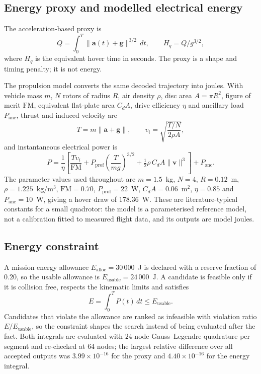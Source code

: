 \documentclass[conference]{IEEEtran}
\begin{document}
\subsection{Energy proxy and modelled electrical energy}
The acceleration-based proxy is
\begin{equation}
Q = \int_0^{T} \lVert \mathbf{a}(t) + \mathbf{g} \rVert^{3/2}\, dt ,
\qquad H_q = Q / g^{3/2},
\end{equation}
where $H_q$ is the equivalent hover time in seconds. The proxy is a shape and
timing penalty; it is not energy.

The propulsion model converts the same decoded trajectory into joules. With
vehicle mass $m$, $N$ rotors of radius $R$, air density $\rho$, disc area $A =
\pi R^2$, figure of merit $\mathrm{FM}$, equivalent flat-plate area $C_dA$,
drive efficiency $\eta$ and ancillary load $P_{\mathrm{anc}}$, thrust and
induced velocity are
\begin{equation}
T = m\lVert \mathbf{a} + \mathbf{g}\rVert, \qquad
v_i = \sqrt{\frac{T/N}{2\rho A}},
\end{equation}
and instantaneous electrical power is
\begin{equation}
P = \frac{1}{\eta}\!\left[\frac{T v_i}{\mathrm{FM}}
+ P_{\mathrm{prof}}\!\left(\frac{T}{mg}\right)^{3/2}
+ \tfrac{1}{2}\rho\, C_dA \lVert \mathbf{v}\rVert^3\right] + P_{\mathrm{anc}}.
\end{equation}
The parameter values used throughout are $m = 1.5$~kg, $N = 4$, $R = 0.12$~m,
$\rho = 1.225$~kg/m$^3$, $\mathrm{FM} = 0.70$, $P_{\mathrm{prof}} = 22$~W,
$C_dA = 0.06$~m$^2$, $\eta = 0.85$ and $P_{\mathrm{anc}} = 10$~W, giving a hover
draw of $178.36$~W. These are literature-typical constants for a small
quadrotor: the model is a parameterised reference model, not a calibration
fitted to measured flight data, and its outputs are model joules.

\subsection{Energy constraint}
A mission energy allowance $E_{\mathrm{alloc}} = 30\,000$~J is declared with a
reserve fraction of $0.20$, so the usable allowance is $E_{\mathrm{usable}} =
24\,000$~J. A candidate is feasible only if it is collision free, respects the
kinematic limits and satisfies
\begin{equation}
E = \int_0^T P(t)\,dt \le E_{\mathrm{usable}} .
\end{equation}
Candidates that violate the allowance are ranked as infeasible with violation
ratio $E / E_{\mathrm{usable}}$, so the constraint shapes the search instead of
being evaluated after the fact. Both integrals are evaluated with $24$-node
Gauss--Legendre quadrature per segment and re-checked at $64$ nodes; the largest
relative difference over all accepted outputs was $3.99\times 10^{-16}$ for the
proxy and $4.40\times 10^{-16}$ for the energy integral.
\end{document}
